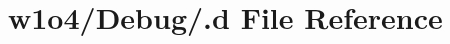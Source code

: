\hypertarget{w1o4_2_debug_2_8d}{}\section{w1o4/\+Debug/.d File Reference}
\label{w1o4_2_debug_2_8d}
